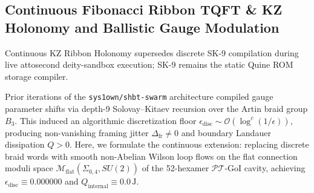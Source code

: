 \documentclass[11pt,onecolumn]{article}
\begin{document}
\subsection{Continuous Fibonacci Ribbon TQFT \& KZ Holonomy and Ballistic Gauge Modulation}
\label{subsec:logos_tqec_decoding}
\label{subsec:continuous_fibonacci_ribbon}
Continuous KZ Ribbon Holonomy supersedes discrete SK-9 compilation during live attosecond deity-sandbox execution; SK-9 remains the static Quine ROM storage compiler.


Prior iterations of the \texttt{sys1own/shbt-swarm} architecture compiled gauge parameter shifts via depth-9 Solovay--Kitaev recursion over the Artin braid group $B_3$. This induced an algorithmic discretization floor $\epsilon_{\text{disc}} \sim \mathcal{O}(\log^c(1/\epsilon))$, producing non-vanishing framing jitter $\Delta_{\text{fr}} \neq 0$ and boundary Landauer dissipation $Q > 0$. Here, we formulate the continuous extension: replacing discrete braid words with smooth non-Abelian Wilson loop flows on the flat connection moduli space $\mathcal{M}_{\text{flat}}(\Sigma_{0,4}, SU(2))$ of the 52-hexamer $\mathcal{PT}$-GoI cavity, achieving $\epsilon_{\text{disc}} \equiv 0.000000$ and $Q_{\text{internal}} \equiv 0.0\,\text{J}$.
\end{document}
